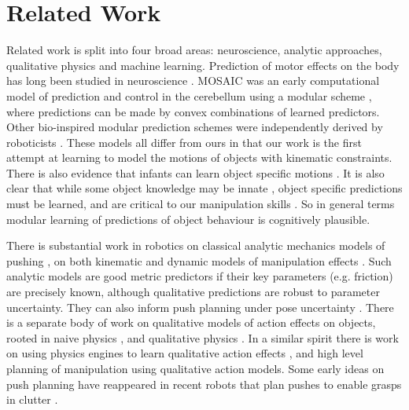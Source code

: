 \section{Related Work}\label{sec:Background}

Related work is split into four broad areas: neuroscience, analytic approaches, qualitative physics and machine learning. Prediction of motor effects on the body has long been studied in neuroscience \citep{Miall1996,flanagan03}.  MOSAIC was an early computational model of prediction and control in the cerebellum using a modular scheme \citep{Haruno_MOSAIC_2008}, where predictions can be made by convex combinations of learned predictors. Other bio-inspired modular prediction schemes were independently derived by roboticists \citep{demiris2006hierarchical}. These models all differ from ours in that our work is the first attempt at learning to model the motions of objects with kinematic constraints. There is also evidence that infants can learn object specific motions \citep{Bahrick1995}. It is also clear that while some object knowledge may be innate \citep{spelke1994early}, object specific predictions must be learned, and are critical to our manipulation skills \citep{flanagan06}. So in general terms modular learning of predictions of object behaviour is cognitively plausible.

There is substantial work in robotics on classical analytic mechanics models of pushing \citep{mason_manipulator_1982,lynch_mechanics_1992,peshkin_motion_1988,cappelleri_designing_2006}, on both kinematic and dynamic models of manipulation effects \citep{mason_mechanics_2001}. Such analytic models are good metric predictors if their key parameters (e.g. friction) are precisely known, although qualitative predictions are robust to parameter uncertainty. They can also inform push planning under pose uncertainty \citep{brost1985planning}. There is a separate body of work on qualitative models of action effects on objects, rooted in naive physics \citep{hayes1995second}, and qualitative physics \citep{kuipers1986qualitative}. In a similar spirit there is work on using physics engines to learn qualitative action effects \citep{Mugan-tamd-12}, and high level planning of manipulation \citep{stillman08ijrr,roy2004mental} using qualitative action models. Some early ideas on push planning have reappeared in recent robots that plan pushes to enable grasps in clutter \citep{Dogar_2010}.

